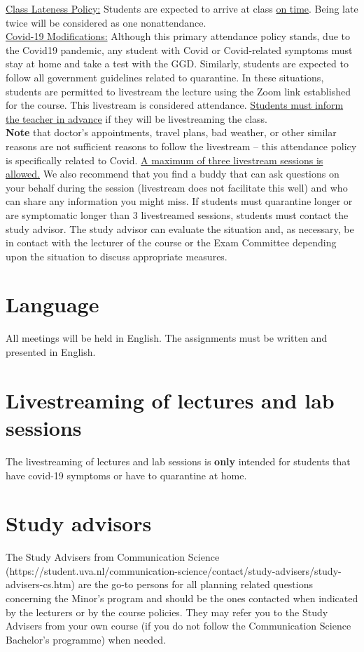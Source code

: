 \documentclass[a4paper,10pt,twocolumn]{report}
\begin{document}
	\underline{Class Lateness Policy:} Students are expected to arrive at class \underline{on time}. Being late twice will be considered as one nonattendance. \\

	\underline{Covid-19 Modifications:} Although this primary attendance policy stands, due to the Covid19 pandemic, any student with Covid or Covid-related symptoms must stay at home and take a test with the GGD.  Similarly, students are expected to follow all government guidelines related to quarantine. In these situations, students are permitted to livestream the lecture using the Zoom link established for the course. This livestream is considered attendance. \underline{Students must inform the teacher in advance} if they will be livestreaming the class. \\  

	\textbf{Note} that doctor's appointments, travel plans, bad weather, or other similar reasons are not sufficient reasons to follow the livestream – this attendance policy is specifically related to Covid. \underline{A maximum of three livestream sessions is allowed.} We also recommend that you find a buddy that can ask questions on your behalf during the session (livestream does not facilitate this well) and who can share any information you might miss.  If students must quarantine longer or are symptomatic longer than 3 livestreamed sessions, students must contact the study advisor. The study advisor can evaluate the situation and, as necessary, be in contact with the lecturer of the course or the Exam Committee depending upon the situation to discuss appropriate measures. 

	\section{Language}
	All meetings will be held in English. The assignments must be written and presented in English. 


	\section{Livestreaming of lectures and lab sessions}
	The livestreaming of lectures and lab sessions is \textbf{only} intended for students that have covid-19 symptoms or have to quarantine at home. 

	\section{Study advisors}
	The Study Advisers from Communication Science (https://student.uva.nl/communication-science/contact/study-advisers/study-advisers-cs.htm) are the go-to persons for all planning related questions concerning the Minor’s program and should be the ones contacted when indicated by the lecturers or by the course policies. They may refer you to the Study Advisers from your own course (if you do not follow the Communication Science Bachelor’s programme) when needed. 
	
\end{document}
